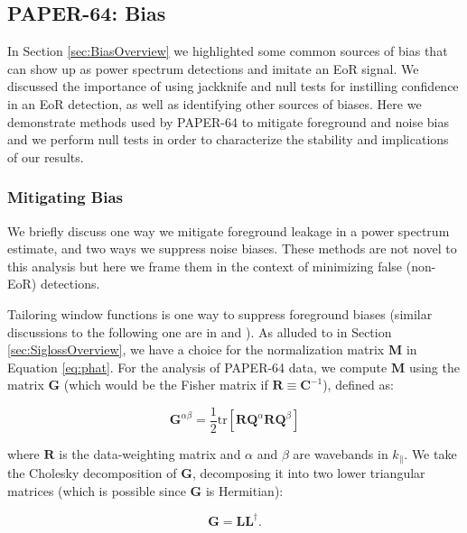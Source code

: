 \documentclass[preprint2,numberedappendix,tighten]{aastex6}  %
\begin{document}

\subsection{PAPER-64: Bias}
\label{sec:Bias}

In Section \ref{sec:BiasOverview} we highlighted some common sources of bias that can show up as power spectrum 
detections and imitate an EoR signal. We discussed the importance of using jackknife and null tests for instilling confidence in an EoR 
detection, as well as identifying other sources of biases. Here we demonstrate methods used by PAPER-64 to mitigate 
foreground and noise bias and we perform null tests in order to characterize the stability and implications of our results.

\subsubsection{Mitigating Bias}
\label{sec:MitBias}

We briefly discuss one way we mitigate foreground leakage in a power spectrum estimate, and two ways we 
suppress noise biases. These methods are not novel to this analysis but here we frame them in the context of minimizing false 
(non-EoR) detections. 

Tailoring window functions is one way to suppress foreground biases (similar discussions to the following one are in \citet{liu_et_al2014b} and ). As alluded to in Section \ref{sec:SiglossOverview}, we 
have a choice for the normalization matrix $\textbf{M}$ in Equation \eqref{eq:phat}. For the analysis of PAPER-64 data, we 
compute $\textbf{M}$ using the matrix $\textbf{G}$ (which would be the Fisher matrix if $\textbf{R} \equiv \textbf{C}^{-1}$), defined as:

\begin{equation}
\textbf{G}^{\alpha\beta} = \frac{1}{2} \text{tr} [\textbf{R}\textbf{Q}^{\alpha}\textbf{R}\textbf{Q}^{\beta} ]
\end{equation}

\noindent where $\textbf{R}$ is the data-weighting matrix and $\alpha$ and $\beta$ are wavebands in $k_{\parallel}$. We take 
the Cholesky decomposition of $\textbf{G}$, decomposing it into two lower triangular matrices (which is possible since $\textbf{G}$ is Hermitian):

\begin{equation}
\textbf{G} = \textbf{LL}^{\dagger}.
\end{equation}
\end{document}
